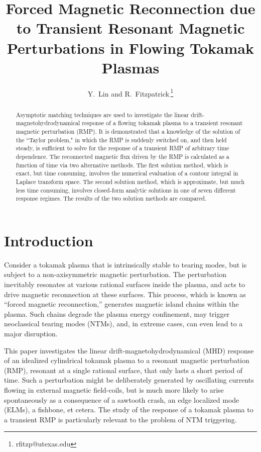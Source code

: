 \documentclass[12pt,prb,aps]{revtex4-1}
\begin{document}
\title{Forced Magnetic Reconnection due to Transient Resonant Magnetic Perturbations in Flowing Tokamak Plasmas}
\author{Y.~Lin and R.~Fitzpatrick\,\footnote{rfitzp@utexas.edu}}

\begin{abstract}
Asymptotic matching techniques are used to investigate the linear drift-magnetohydrodynamical response of a flowing tokamak plasma to a transient  resonant magnetic perturbation (RMP). It is demonstrated that a knowledge of the solution of the ``Taylor problem," in which the RMP is suddenly switched on, and then held steady, is
sufficient to solve for the response of a transient RMP of arbitrary time dependence. 
The reconnected magnetic flux driven by the RMP  is  calculated as a function of time via  two alternative  methods.
The first solution  method, which is exact, but time consuming,  involves the numerical 
evaluation of a contour integral in Laplace transform space. The second solution method, which is approximate, but much less time consuming, involves
closed-form analytic solutions in one of seven different response regimes. 
 The results of the two solution methods are compared. 
\end{abstract}

\maketitle

\section{Introduction}
Consider a  tokamak plasma that is intrinsically stable to tearing modes, but is subject to a non-axisymmetric magnetic perturbation. 
The perturbation  inevitably 
resonates at various rational surfaces inside the plasma, and  acts to drive magnetic reconnection at these surfaces. This
process, which is known as ``forced magnetic reconnection,''  generates magnetic island chains within the plasma.\cite{err1,err1a}  Such chains degrade the plasma energy confinement,\cite{chang} may  trigger neoclassical tearing modes (NTMs),\cite{ntm2,ntm1,ntm3} and, in extreme cases, can even lead to a major disruption.

This paper  investigates the linear drift-magnetohydrodynamical (MHD) response of an idealized cylindrical  tokamak plasma to a resonant magnetic
perturbation (RMP),  resonant at a single rational surface,  that only lasts a short period of time.  Such a perturbation might be deliberately  generated by oscillating currents
flowing in external magnetic field-coils,\cite{mast,jtext}  but is much more likely to  arise spontaneously as a consequence of a sawtooth crash,\cite{ntm2} an edge localized mode
(ELMs),\cite{elm}  a fishbone, et cetera. The study of the response of a tokamak plasma to a transient RMP is particularly relevant to the problem of NTM triggering.\cite{ntm}
\end{document}
